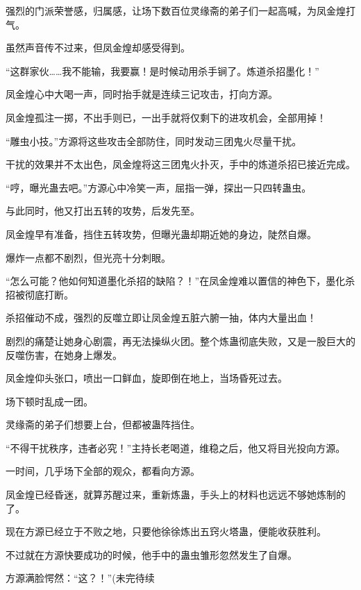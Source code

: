 \begin{this_body}
强烈的门派荣誉感，归属感，让场下数百位灵缘斋的弟子们一起高喊，为凤金煌打气。

虽然声音传不过来，但凤金煌却感受得到。

“这群家伙……我不能输，我要赢！是时候动用杀手锏了。炼道杀招墨化！”

凤金煌心中大喝一声，同时抬手就是连续三记攻击，打向方源。

凤金煌孤注一掷，不出手则已，一出手就将仅剩下的进攻机会，全部用掉！

“雕虫小技。”方源将这些攻击全部防住，同时发动三团鬼火尽量干扰。

干扰的效果并不太出色，凤金煌将这三团鬼火扑灭，手中的炼道杀招已接近完成。

“哼，曝光蛊去吧。”方源心中冷笑一声，屈指一弹，探出一只四转蛊虫。

与此同时，他又打出五转的攻势，后发先至。

凤金煌早有准备，挡住五转攻势，但曝光蛊却期近她的身边，陡然自爆。

爆炸一点都不剧烈，但光亮十分刺眼。

“怎么可能？他如何知道墨化杀招的缺陷？！”在凤金煌难以置信的神色下，墨化杀招被彻底打断。

杀招催动不成，强烈的反噬立即让凤金煌五脏六腑一抽，体内大量出血！

剧烈的痛楚让她身心剧震，再无法操纵火团。整个炼蛊彻底失败，又是一股巨大的反噬伤害，在她身上爆发。

凤金煌仰头张口，喷出一口鲜血，旋即倒在地上，当场昏死过去。

场下顿时乱成一团。

灵缘斋的弟子们想要上台，但都被蛊阵挡住。

“不得干扰秩序，违者必究！”主持长老喝道，维稳之后，他又将目光投向方源。

一时间，几乎场下全部的观众，都看向方源。

凤金煌已经昏迷，就算苏醒过来，重新炼蛊，手头上的材料也远远不够她炼制的了。

现在方源已经立于不败之地，只要他徐徐炼出五窍火塔蛊，便能收获胜利。

不过就在方源快要成功的时候，他手中的蛊虫雏形忽然发生了自爆。

方源满脸愕然：“这？！”(未完待续

\end{this_body}

